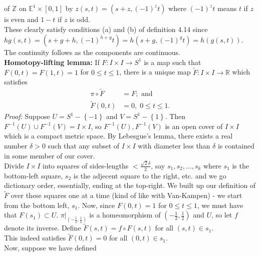 \documentclass[a4paper]{article}
\begin{document}
    of $\mathbb{Z}$ on $\mathbb{E}^{1} \times \left[ 0,1 \right] $ by
     $z(s,t) =
     (s+z, (-1)^{z} t)$ where
     $(-1)^{z}t$ means $t$ if $z$ is even and
     $1-t$ if $z$ is odd.\\
     These clearly satisfy conditions (a) and (b) of definition 4.14
     since
     $hg(s,t) = (s+g+h, (-1)^{h+g} t) =
     h \left( s+g, (-1)^{g}t \right) 
     = h \left( g (s,t) \right) $.\\
     The continuity follows as the components are continuous.\\
     \linebreak
     \textbf{Homotopy-lifting lemma:} If $F  \colon I \times I \to S^{1} $ is
     a map such that $F(0,t) = F(1,t) = 1$ for
     $0 \le t\le 1$, there is a unique map
     $\tilde{F}  \colon I \times I \to \mathbb{R}$ which satisfies
     \begin{align*}
         \pi \circ \tilde{F} 
         &= F; \text{ and}\\
         \tilde{F}(0,t)
         &= 0,\; 0\le t\le 1.
     \end{align*}
     \textit{Proof:}
     Suppose $U = S^{1} - \left\{ -1 \right\} $ and
     $V = S^{1} - \left\{ 1 \right\} $. Then
     $F^{-1}(U) \cup F^{-1}(V) = I \times I$, so
     $F^{-1}(U), F^{-1}(V)$ is an open cover of $I \times I$ which is a compact
     metric space. By Lebesgue's lemma, there exists a real number
     $\delta > 0$ such that any subset of $I \times I$ with diameter less than
     $\delta$ is contained in some member of our cover.\\
     Divide  $I \times I$ into squares
     of sides-lengths $< \frac{\sqrt{2} \delta}{2}$, say
     $s_1, s_2, \ldots, s_k$ where
     $s_1$ is the bottom-left square, $s_2$ is the adjecent square to the
     right, etc. and we go dictionary order, essentially, ending at the
     top-right.
     We built up our definition
     of $\tilde{F}$ over these squares one at a time (kind of like with
     Van-Kampen) - we start from the bottom left, $s_1$. Now,
     since $F (0,t) = 1$ for $0 \le t\le 1$, we must have that
     $F(s_1) \subset U$. $\pi|_{(-\frac{1}{2},\frac{1}{2})}$ is a homeomorphism
     of $(-\frac{1}{2},\frac{1}{2})$ and $U$, so let $f$ denote its inverse.
     Define
     $\tilde{F}(s,t) = f \circ F(s,t)$ for all $(s,t) \in s_1$.\\
     This indeed satisfies $\tilde{F}(0,t) = 0$ for
     all $(0,t) \in s_1$. \\
     \linebreak
     Now, suppose we have defined 
\end{document}
